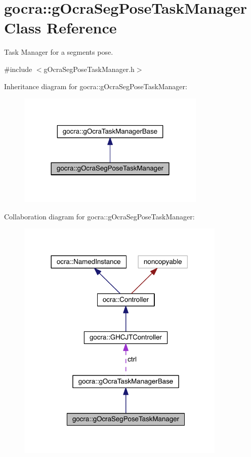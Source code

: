 \hypertarget{classgocra_1_1gOcraSegPoseTaskManager}{}\section{gocra\+:\+:g\+Ocra\+Seg\+Pose\+Task\+Manager Class Reference}
\label{classgocra_1_1gOcraSegPoseTaskManager}


Task Manager for a segment\textquotesingle{}s pose.  




{\ttfamily \#include $<$g\+Ocra\+Seg\+Pose\+Task\+Manager.\+h$>$}



Inheritance diagram for gocra\+:\+:g\+Ocra\+Seg\+Pose\+Task\+Manager\+:\nopagebreak
\begin{figure}[H]
\begin{center}
\leavevmode
\includegraphics[width=254pt]{da/df2/classgocra_1_1gOcraSegPoseTaskManager__inherit__graph}
\end{center}
\end{figure}


Collaboration diagram for gocra\+:\+:g\+Ocra\+Seg\+Pose\+Task\+Manager\+:\nopagebreak
\begin{figure}[H]
\begin{center}
\leavevmode
\includegraphics[width=282pt]{d2/ddc/classgocra_1_1gOcraSegPoseTaskManager__coll__graph}
\end{center}
\end{figure}
